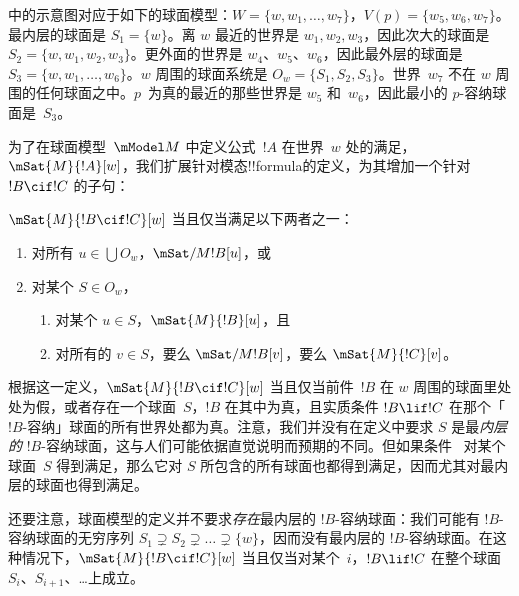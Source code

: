 \documentclass[../../../include/open-logic-section]{subfiles}
\begin{document}
 中的示意图对应于如下的球面模型：$W = \{w, w_1, \dots, w_7\}$，$V(p) = \{w_5, w_6, w_7\}$。最内层的球面是 $S_1 = \{w\}$。离 $w$ 最近的世界是 $w_1, w_2, w_3$，因此次大的球面是 $S_2 = \{w, w_1, w_2, w_3\}$。更外面的世界是 $w_4$、$w_5$、$w_6$，因此最外层的球面是 $S_3 = \{w, w_1, \dots, w_6\}$。$w$ 周围的球面系统是 $O_w = \{S_1, S_2, S_3\}$。世界~$w_7$ 不在 $w$ 周围的任何球面之中。$p$~为真的最近的那些世界是 $w_5$ 和~$w_6$，因此最小的 $p$-容纳球面是~$S_3$。

为了在球面模型~$\mModel M$ 中定义公式~$!A$ 在世界~$w$ 处的满足，$\mSat{M}{!A}[w]$，我们扩展针对模态!!{formula}的定义，为其增加一个针对 $!B \cif !C$ 的子句：

\begin{defn}
  $\mSat{M}{!B \cif !C}[w]$ 当且仅当满足以下两者之一：
  \begin{enumerate}
  \item{} 对所有 $u \in \bigcup O_w$，$\mSat/{M}{!B}[u]$，或
  \item{} 对某个 $S \in O_w$，
    \begin{enumerate}
      \item 对某个 $u \in S$，$\mSat{M}{!B}[u]$，且
      \item 对所有的 $v \in S$，要么 $\mSat/{M}{!B}[v]$，要么 $\mSat{M}{!C}[v]$。
    \end{enumerate}
  \end{enumerate}
\end{defn}

根据这一定义，$\mSat{M}{!B \cif !C}[w]$ 当且仅当前件~$!B$ 在 $w$ 周围的球面里处处为假，或者存在一个球面~$S$，$!B$ 在其中为真，且实质条件 $!B \lif !C$ 在那个「$!B$-容纳」球面的所有世界处都为真。注意，我们并没有在定义中要求 $S$ 是最\emph{内层的} $!B$-容纳球面，这与人们可能依据直觉说明而预期的不同。但如果条件~ 对某个球面~$S$ 得到满足，那么它对 $S$ 所包含的所有球面也都得到满足，因而尤其对最内层的球面也得到满足。

还要注意，球面模型的定义并不要求\emph{存在}最内层的 $!B$-容纳球面：我们可能有 $!B$-容纳球面的无穷序列 $S_1 \supsetneq S_2 \supsetneq \dots \supsetneq \{w\}$，因而没有最内层的 $!B$-容纳球面。在这种情况下，$\mSat{M}{!B \cif !C}[w]$ 当且仅当对某个~$i$，$!B \lif !C$ 在整个球面 $S_i$、$S_{i+1}$、\dots 上成立。
\end{document}

